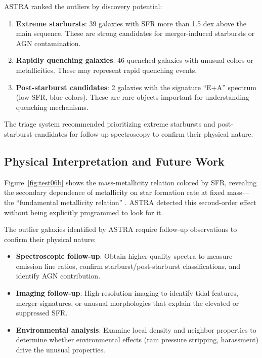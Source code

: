 ASTRA ranked the outliers by discovery potential:

\begin{enumerate}
\item \textbf{Extreme starbursts}: 39 galaxies with SFR more than 1.5 dex above the main sequence. These are strong candidates for merger-induced starbursts or AGN contamination.
\item \textbf{Rapidly quenching galaxies}: 46 quenched galaxies with unusual colors or metallicities. These may represent rapid quenching events.
\item \textbf{Post-starburst candidates}: 2 galaxies with the signature ``E+A'' spectrum (low SFR, blue colors). These are rare objects important for understanding quenching mechanisms.
\end{enumerate}

The triage system recommended prioritizing extreme starbursts and post-starburst candidates for follow-up spectroscopy to confirm their physical nature.

\subsection{Physical Interpretation and Future Work}

Figure~\ref{fig:test06b} shows the mass-metallicity relation colored by SFR, revealing the secondary dependence of metallicity on star formation rate at fixed mass---the ``fundamental metallicity relation'' \cite{mannucci2010}. ASTRA detected this second-order effect without being explicitly programmed to look for it.

The outlier galaxies identified by ASTRA require follow-up observations to confirm their physical nature:
\begin{itemize}
\item \textbf{Spectroscopic follow-up}: Obtain higher-quality spectra to measure emission line ratios, confirm starburst/post-starburst classifications, and identify AGN contribution.
\item \textbf{Imaging follow-up}: High-resolution imaging to identify tidal features, merger signatures, or unusual morphologies that explain the elevated or suppressed SFR.
\item \textbf{Environmental analysis}: Examine local density and neighbor properties to determine whether environmental effects (ram pressure stripping, harassment) drive the unusual properties.
\end{itemize}

